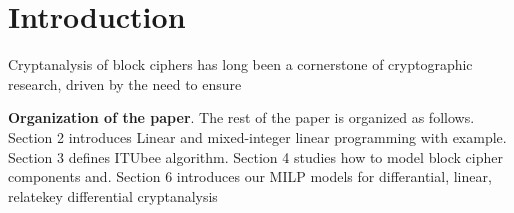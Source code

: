 \section{Introduction}
Cryptanalysis of block ciphers has long been a cornerstone of cryptographic research, driven by the need to ensure 

\textbf{Organization of the paper}. The rest of the paper is organized as follows. Section 2 introduces Linear and mixed-integer linear programming with example. Section 3 defines ITUbee algorithm. Section 4 studies how to model block cipher components and. Section 6 introduces our MILP models for differantial, linear, relatekey differential cryptanalysis